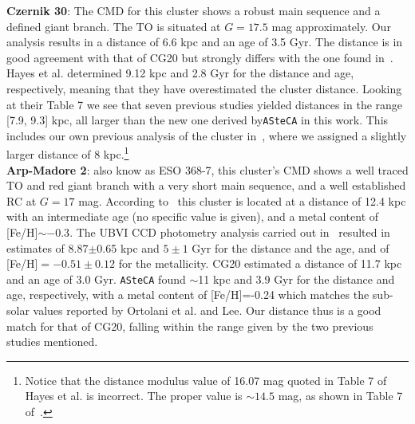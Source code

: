 \documentclass[draft]{aa}
\begin{document}
  \textbf{Czernik 30}: The CMD for this cluster shows a robust main sequence
  and a defined giant branch. The TO is situated at $G=17.5$ mag approximately.
  Our analysis results in a distance of 6.6 kpc and an age of 3.5 Gyr. The
  distance is in good agreement with that of CG20 but strongly differs with
  the one found in~\cite{Hayes_2015}. Hayes et al. determined 9.12 kpc and 2.8
  Gyr for the distance and age, respectively, meaning that they have
  overestimated the cluster distance. Looking at their Table 7 we see that
  seven previous studies yielded distances in the range [7.9, 9.3] kpc, all
  larger than the new one derived by\texttt{ASteCA} in this work.
  This includes our own previous analysis of the
  cluster in~\cite{Perren_2015}, where we assigned a slightly larger distance of
  8 kpc.\footnote{Notice that the distance modulus value of 16.07 mag quoted in
  Table 7 of Hayes et al. is incorrect. The proper value is $\sim14.5$ mag, as
  shown in Table 7 of~\cite{Perren_2015}.}\\

  \textbf{Arp-Madore 2}: also know as ESO 368-7, this cluster's CMD shows
  a well traced TO and red giant branch with a very short main sequence, and a
  well established RC at $G=17$ mag.
  According to~\cite{Ortolani_1995} this cluster is located at a distance of
  12.4 kpc with an intermediate age (no specific value is given), and a metal
  content of [Fe/H]$\sim-0.3$.
  The UBVI CCD photometry analysis carried out in~\cite{Lee_1997} resulted in
  estimates of 8.87$\pm$0.65 kpc and $5\pm1$ Gyr for the distance and the age,
  and of [Fe/H]$=-0.51\pm0.12$ for the metallicity.
  CG20 estimated a distance of 11.7 kpc and an age of 3.0 Gyr.
  \texttt{ASteCA} found $\sim$11 kpc and 3.9 Gyr for the distance and
  age, respectively, with a metal content of [Fe/H]=-0.24 which matches the
  sub-solar values reported by Ortolani et al. and Lee.
  Our distance thus is a good match for that of CG20, falling within the range
  given by the two previous studies mentioned.\\
\end{document}
